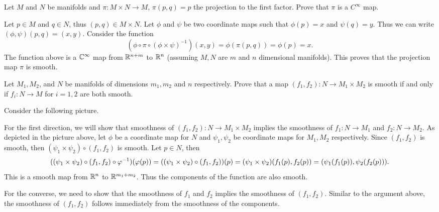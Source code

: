 \begin{problem}
	Let $ M $ and $ N $ be manifolds and $ \pi: M\times N \to M $, $ \pi(p,q) = p $ the projection to the first factor. Prove that $ \pi $ is a $ C^\infty $ map.
\end{problem}

\begin{solution}
	Let $ p \in M $ and $ q \in N $, thus $ (p,q) \in M\times N $. Let $ \phi $ and $ \psi $ be two coordinate maps such that $ \phi(p) = x $ and $ \psi(q) = y $. Thus we can write $ (\phi, \psi)(p,q) = (x,y) $. Consider the function
	\[ (\phi \circ \pi \circ (\phi\times \psi)^{-1})(x,y) = \phi(\pi(p,q)) = \phi(p) = x.  \]
	The function above is a $ \mathbb{C}^\infty $ map from $ \mathbb{R}^{n+m} $ to $ \mathbb{R}^n $ (assuming $ M, N $ are $ m $ and $ n $ dimensional manifolds). This proves that the projection map $ \pi $ is smooth.
\end{solution}

\begin{problem}
	Let $ M_1, M_2 $, and $ N $ be manifolds of dimensions $ m_1,m_2 $ and $ n $ respectively. Prove that a map $ (f_1,f_2): N \to M_1\times M_2 $ is smooth if and only if $ f_i:N\to M $ for $ i=1,2 $ are both smooth.
\end{problem} 

\begin{solution}
	Consider the following picture.
	
	\FloatBarrier
	
	For the first direction, we will show that smoothness of $ (f_1,f_2): N \to M_1\times M_2 $ implies the smoothness of $ f_1:N\to M_1 $ and $ f_2: N \to M_2 $. As depicted in the picture above, let $ \phi $ be a coordinate map for $ N $ and $ \psi_1, \psi_2 $ be coordinate maps for $ M_1,M_2 $ respectively. Since $ (f_1,f_2) $ is smooth, then $ (\psi_1 \times \psi_2) \circ (f_1,f_2) $ is smooth. Let $ p \in N $, then
	\[ ((\psi_1 \times \psi_2) \circ (f_1,f_2) \circ \varphi^{-1})(\varphi(p)) =
	((\psi_1 \times \psi_2) \circ (f_1,f_2)) (p) = (\psi_1\times \psi_2)(f_1(p),f_2(p)) = (\psi_1(f_1(p)), \psi_2(f_2(p))).
	 \]
	This is a smooth map from $ \mathbb{R}^n $ to $ \mathbb{R}^{m_1+m_2} $. Thus the components of the function are also smooth.
	
	For the converse, we need to show that the smoothness of $ f_1 $ and $ f_2 $ implies the smoothness of $ (f_1,f_2) $. Similar to the argument above, the smoothness of $ (f_1,f_2) $ follows immediately from the smoothness of the components.
\end{solution}

